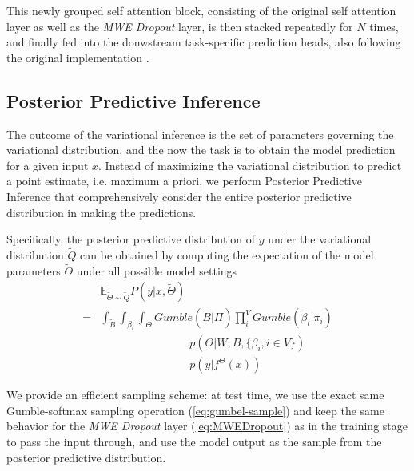 This newly grouped self attention block, consisting of the original self attention layer as well as the \textit{MWE Dropout} layer, is then stacked repeatedly for $N$ times, and finally fed into the donwstream task-specific prediction heads, also following the original implementation \cite{devlin2018bert}.


\subsection{Posterior Predictive Inference} \label{sec:prediction}
The outcome of the variational inference is the set of parameters governing the variational distribution, and the now the task is to obtain the model prediction for a given input $x$.
Instead of maximizing the variational distribution to predict a point estimate, i.e. maximum a priori, we perform Posterior Predictive Inference that comprehensively 
consider the entire posterior predictive distribution in making the predictions.

Specifically, the posterior predictive distribution of $y$ under the variational distribution $\tilde{Q}$ can be obtained by computing the expectation of the model parameters $\tilde{\Theta}$ under all possible model settings
\begin{align}
& \mathbb{E}_{\tilde{\Theta} \sim \tilde{Q}} P (y | x, \tilde{\Theta}) \nonumber\\ 
= & \int_{\tilde{B}} \int_{\tilde{\beta}_i}\int_{\Theta} Gumble(\tilde{B} | \Pi) \prod_i^{V} Gumble(\tilde{\beta}_i | \pi_i) \nonumber\\ 
& \quad \quad \quad \quad \quad \quad \quad \quad p(\Theta \vert W, B, \{\beta_i, i \in V\}) \nonumber\\ 
& \quad \quad \quad \quad \quad \quad \quad \quad p(y \vert f^{\Theta}(x)) 
\label{eq:prediction}
\end{align}

We provide an efficient sampling scheme:
at test time,
we use the exact same Gumble-softmax sampling operation (\autoref{eq:gumbel-sample}) and keep the same behavior for the \textit{MWE Dropout} layer (\autoref{eq:MWEDropout}) as in the training stage to pass the input through, and use the model output as the sample from the posterior predictive distribution.